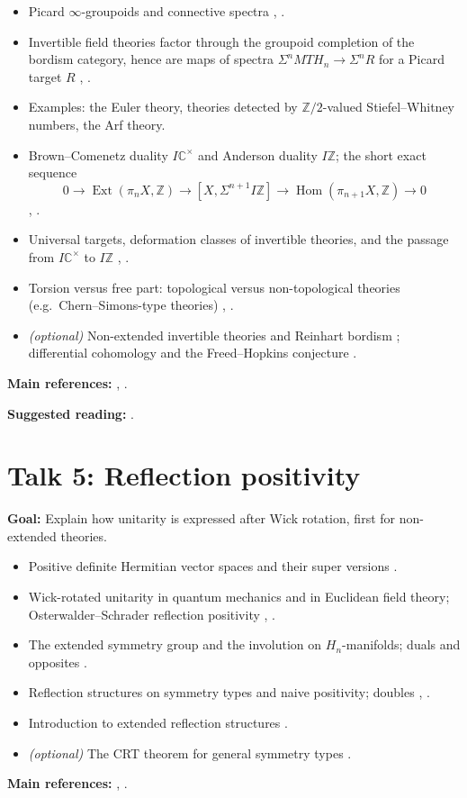 \documentclass[11pt,a4paper]{article}
\newcommand{\MT}{\mathit{MT}}
\newcommand{\IZ}{I\mathbb{Z}}
\newcommand{\talk}[2]{\section*{Talk #1: #2}}
\newcommand{\refs}[1]{\par\smallskip\textbf{Main references:} #1}
\newcommand{\suggested}[1]{\par\textbf{Suggested reading:} #1}
\begin{document}
\begin{itemize}
  \item Picard $\infty$-groupoids and connective spectra \cite[L6.1, L6.5]{F}, \cite[Appendix~A.4]{F}.
  \item Invertible field theories factor through the groupoid completion of the bordism category, hence are maps of spectra $\Sigma^n\MT H_n \to \Sigma^n R$ for a Picard target $R$ \cite[L6.2, L6.8]{F}, \cite[\S5.2]{FH}.
  \item Examples: the Euler theory, theories detected by $\mathbb{Z}/2$-valued Stiefel--Whitney numbers, the Arf theory.
  \item Brown--Comenetz duality $I\mathbb{C}^\times$ and Anderson duality $\IZ$; the short exact sequence
  \[0 \to \operatorname{Ext}(\pi_{n}X,\mathbb{Z}) \to [X,\Sigma^{n+1}\IZ] \to \operatorname{Hom}(\pi_{n+1}X,\mathbb{Z}) \to 0\]
  \cite[L6.7]{F}, \cite[\S5.3]{FH}.
  \item Universal targets, deformation classes of invertible theories, and the passage from $I\mathbb{C}^\times$ to $\IZ$ \cite[L6.9, L6.10]{F}, \cite[\S5.3]{FH}.
  \item Torsion versus free part: topological versus non-topological theories (e.g.\ Chern--Simons-type theories) \cite[\S5.4]{FH}, \cite[L9.3]{F}.
  \item \emph{(optional)} Non-extended invertible theories and Reinhart bordism \cite[L6.4]{F}; differential cohomology and the Freed--Hopkins conjecture \cite[L9.4]{F}.
\end{itemize}
\refs{\cite[L6, L9]{F}, \cite[\S\S5.2--5.4]{FH}.}
\suggested{\cite{Fsre}.}

\talk{5}{Reflection positivity}

\textbf{Goal:} Explain how unitarity is expressed after Wick rotation, first for non-extended theories.

\begin{itemize}
  \item Positive definite Hermitian vector spaces and their super versions \cite[L7.1]{F}.
  \item Wick-rotated unitarity in quantum mechanics and in Euclidean field theory; Osterwalder--Schrader reflection positivity \cite[L7.2--L7.3]{F}, \cite[\S\S3.1--3.2]{FH}.
  \item The extended symmetry group and the involution on $H_n$-manifolds; duals and opposites \cite[\S3.3, \S\S4.1--4.2]{FH}.
  \item Reflection structures on symmetry types and naive positivity; doubles \cite[L7.4--L7.5]{F}, \cite[\S\S4.3--4.4]{FH}.
  \item Introduction to extended reflection structures \cite[L7.6]{F}.
  \item \emph{(optional)} The CRT theorem for general symmetry types \cite[Appendix~A]{FH}.
\end{itemize}
\refs{\cite[L7]{F}, \cite[\S\S3--4, Appendices~A--B]{FH}.}
\end{document}
